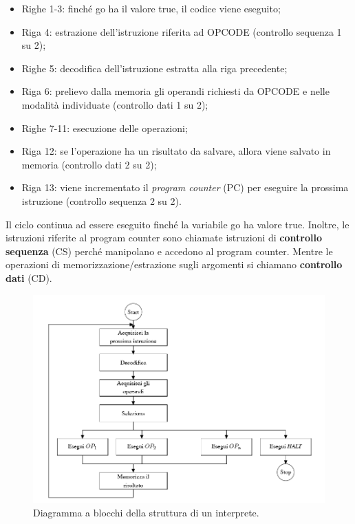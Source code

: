 \documentclass[a4paper]{article}
\begin{document}
	\begin{itemize}
		\item Righe 1-3: finché \textsf{go} ha il valore \textsf{true}, il codice viene eseguito;
		\item Riga 4: estrazione dell'istruzione riferita ad \textsf{OPCODE} (controllo sequenza 1 su 2);
		\item Righe 5: decodifica dell'istruzione estratta alla riga precedente;
		\item Riga 6: prelievo dalla memoria gli operandi richiesti da \textsf{OPCODE} e nelle modalità individuate (controllo dati 1 su 2);
		\item Righe 7-11: esecuzione delle operazioni;
		\item Riga 12: se l'operazione ha un risultato da salvare, allora viene salvato in memoria (controllo dati 2 su 2);
		\item Riga 13: viene incrementato il \emph{program counter} (PC) per eseguire la prossima istruzione (controllo sequenza 2 su 2).
	\end{itemize}
	Il ciclo continua ad essere eseguito finché la variabile \textsf{go} ha valore \textsf{true}. Inoltre, le istruzioni riferite al program counter sono chiamate istruzioni di \textbf{controllo sequenza} (CS) perché manipolano e accedono al program counter. Mentre le operazioni di memorizzazione/estrazione sugli argomenti si chiamano \textbf{controllo dati} (CD).
	\begin{figure}[!htp]
		\centering
		\includegraphics[width=\textwidth]{img/ciclo_esecuzione_interprete.png}
		\caption{Diagramma a blocchi della struttura di un interprete.}
	\end{figure}\newpage
\end{document}
